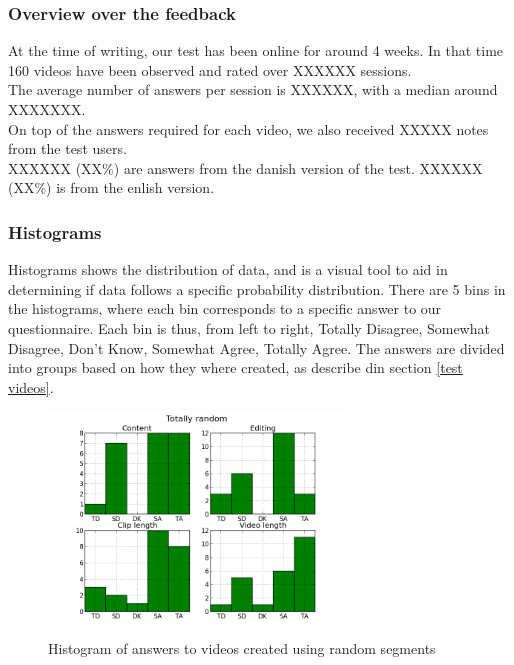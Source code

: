\subsubsection{Overview over the feedback}
%
At the time of writing, our test has been online for around 4 weeks. In that time 160 videos have been observed and rated over XXXXXX sessions.\\
The average number of answers per session is XXXXXX, with a median around XXXXXXX.\\
On top of the answers required for each video, we also received XXXXX notes from the test users.\\
XXXXXX (XX\%) are answers from the danish version of the test. XXXXXX (XX\%) is from the enlish version.
%
\subsubsection{Histograms}\label{sec:histograms}
%
Histograms shows the distribution of data, and is a visual tool to aid in determining if data follows a specific probability distribution. There are 5 bins in the histograms, where each bin corresponds to a specific answer to our questionnaire. Each bin is thus, from left to right, Totally Disagree, Somewhat Disagree, Don't Know, Somewhat Agree, Totally Agree. The answers are divided into groups based on how they where created, as describe din section \ref{test videos}.
%
\begin{figure}[!ht]
     \centering
     \includegraphics[width=0.7\textwidth]{img/totallyrandom_barplot.png}
     \caption{Histogram of answers to videos created using random segments}\label{fig:hist_random}
\end{figure}
%
